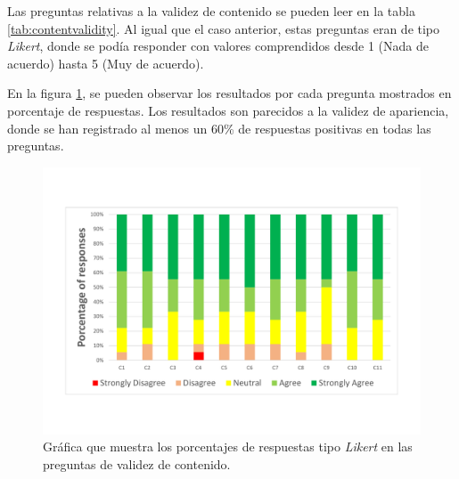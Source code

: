 Las preguntas relativas a la validez de contenido se pueden leer en la tabla \ref{tab:contentvalidity}. Al igual que el caso anterior, estas preguntas eran de tipo \emph{Likert}, donde se podía responder con valores comprendidos desde 1 (Nada de acuerdo) hasta 5 (Muy de acuerdo).

En la figura \ref{fig:contentvalidity}, se pueden observar los resultados por cada pregunta mostrados en porcentaje de respuestas. Los resultados son parecidos a la validez de apariencia, donde se han registrado al menos un 60\% de respuestas positivas en todas las preguntas. 

\begin{figure}[hb]
    \centering
    \includegraphics[trim={15mm 25mm 15mm 25mm},clip,width=\linewidth]{IMG/contentvalidty.pdf}
    \caption{Gráfica que muestra los porcentajes de respuestas tipo \emph{Likert} en las preguntas de validez de contenido.}
    \label{fig:contentvalidity}
\end{figure}




